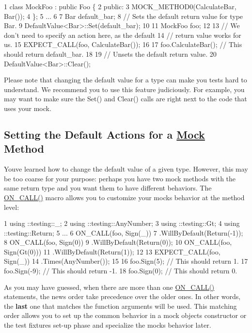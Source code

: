 \begin{DoxyCode}
1 class MockFoo : public Foo \{
2  public:
3   MOCK\_METHOD0(CalculateBar, Bar());
4 \};
5 ...
6 
7   Bar default\_bar;
8   // Sets the default return value for type Bar.
9   DefaultValue<Bar>::Set(default\_bar);
10 
11   MockFoo foo;
12 
13   // We don't need to specify an action here, as the default
14   // return value works for us.
15   EXPECT\_CALL(foo, CalculateBar());
16 
17   foo.CalculateBar();  // This should return default\_bar.
18 
19   // Unsets the default return value.
20   DefaultValue<Bar>::Clear();
\end{DoxyCode}


Please note that changing the default value for a type can make you tests hard to understand. We recommend you to use this feature judiciously. For example, you may want to make sure the {\ttfamily Set()} and {\ttfamily Clear()} calls are right next to the code that uses your mock.

\subsection*{Setting the Default Actions for a \hyperlink{class_mock}{Mock} Method}

You\textquotesingle{}ve learned how to change the default value of a given type. However, this may be too coarse for your purpose\+: perhaps you have two mock methods with the same return type and you want them to have different behaviors. The {\ttfamily \hyperlink{gmock-spec-builders_8h_a5b12ae6cf84f0a544ca811b380c37334}{O\+N\+\_\+\+C\+A\+L\+L()}} macro allows you to customize your mock\textquotesingle{}s behavior at the method level\+:


\begin{DoxyCode}
1 using ::testing::\_;
2 using ::testing::AnyNumber;
3 using ::testing::Gt;
4 using ::testing::Return;
5 ...
6   ON\_CALL(foo, Sign(\_))
7       .WillByDefault(Return(-1));
8   ON\_CALL(foo, Sign(0))
9       .WillByDefault(Return(0));
10   ON\_CALL(foo, Sign(Gt(0)))
11       .WillByDefault(Return(1));
12 
13   EXPECT\_CALL(foo, Sign(\_))
14       .Times(AnyNumber());
15 
16   foo.Sign(5);   // This should return 1.
17   foo.Sign(-9);  // This should return -1.
18   foo.Sign(0);   // This should return 0.
\end{DoxyCode}


As you may have guessed, when there are more than one {\ttfamily \hyperlink{gmock-spec-builders_8h_a5b12ae6cf84f0a544ca811b380c37334}{O\+N\+\_\+\+C\+A\+L\+L()}} statements, the news order take precedence over the older ones. In other words, the {\bfseries last} one that matches the function arguments will be used. This matching order allows you to set up the common behavior in a mock object\textquotesingle{}s constructor or the test fixture\textquotesingle{}s set-\/up phase and specialize the mock\textquotesingle{}s behavior later.

